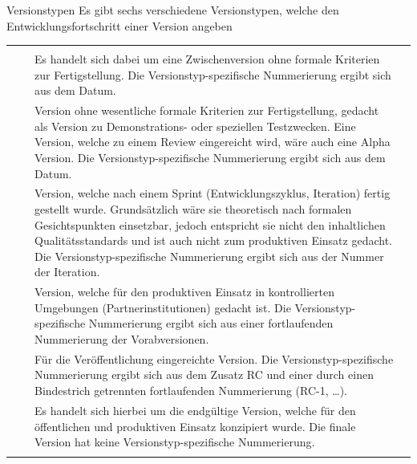 \TableWide
{Versionstypen}%
{Es gibt sechs verschiedene Versionstypen, 
welche den 
Entwicklungsfortschritt einer Version angeben}%
{\label{tab:versionstypen}}%
{}%
{}%
{ %
\begin{tabulary}{\linewidth}[H]{llLl}\addlinespace\toprule\addlinespace
\noindent{}  &
\noindent{} &
\noindent{} &
\noindent{}
\\\addlinespace\midrule\addlinespace
\noindent{}
&
&
Es handelt sich dabei um eine Zwischenversion ohne formale 
Kriterien zur Fertigstellung.
Die Versionstyp-spezifische Nummerierung ergibt sich aus dem 
Datum.
&
\\\addlinespace
\noindent{}
&
&
Version ohne wesentliche formale Kriterien zur 
Fertigstellung, 
gedacht als Version zu Demonstrations- oder speziellen Testzwecken. 
Eine Version, 
welche zu einem Review eingereicht wird, 
wäre auch eine Alpha Version.
Die Versionstyp-spezifische Nummerierung ergibt sich aus dem 
Datum.
&
\\\addlinespace
\noindent{}
&
&
Version, welche nach einem Sprint 
(Entwicklungszyklus, Iteration) 
fertig gestellt wurde. 
Grundsätzlich wäre sie theoretisch nach formalen Gesichtspunkten 
einsetzbar, 
jedoch entspricht sie nicht den inhaltlichen Qualitätsstandards 
und ist auch nicht zum produktiven Einsatz gedacht.
Die Versionstyp-spezifische Nummerierung ergibt sich aus der 
Nummer der Iteration.
&
\\\addlinespace
\noindent{}
&
&
Version, 
welche für den produktiven Einsatz in kontrollierten Umgebungen 
(Partnerinstitutionen) gedacht ist.
Die Versionstyp-spezifische Nummerierung ergibt sich aus einer 
fortlaufenden Nummerierung der Vorabversionen.
&
\\\addlinespace
\noindent{}
&
&
Für die Veröffentlichung 
eingereichte Version.
Die Versionstyp-spezifische Nummerierung ergibt sich aus dem Zusatz 
RC 
und einer durch einen Bindestrich getrennten 
fortlaufenden Nummerierung (RC-1, \ldots).
&
\\\addlinespace
\noindent{}
&
&
Es handelt sich hierbei um die endgültige Version,
welche für den öffentlichen und produktiven Einsatz konzipiert wurde. 
Die finale Version hat keine Versionstyp-spezifische 
Nummerierung.
&
\\\addlinespace\bottomrule
\end{tabulary}

}
